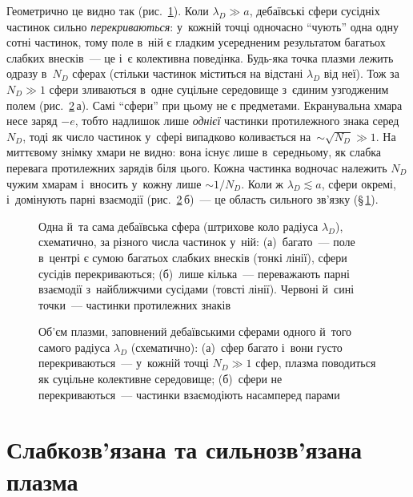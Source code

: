 Геометрично це видно так (рис.~\ref{fig:debye-overlap}). Коли $\lambda_D\gg a$, дебаївські сфери сусідніх
частинок сильно \emph{перекриваються}: у~кожній точці одночасно \enquote{чують} одна одну сотні
частинок, тому поле в~ній є гладким усередненим результатом багатьох слабких внесків~--- це і~є
колективна поведінка. Будь-яка точка плазми лежить
одразу в~$N_D$ сферах (стільки частинок міститься на відстані $\lambda_D$ від неї). Тож за
$N_D\gg1$ сфери зливаються в~одне суцільне середовище з~єдиним узгодженим полем
(рис.~\ref{fig:debye-volume}\,а). Самі \enquote{сфери} при цьому не є предметами. Екранувальна
хмара несе заряд $-e$, тобто надлишок лише \emph{однієї} частинки протилежного знака серед $N_D$,
тоді як число частинок у~сфері випадково коливається на~$\sim\sqrt{N_D}\gg1$. На миттєвому знімку
хмари не видно: вона існує лише в~середньому, як слабка перевага протилежних зарядів біля
цього. Кожна частинка водночас належить $N_D$ чужим хмарам і~вносить у~кожну лише $\sim1/N_D$. Коли ж $\lambda_D\lesssim a$, сфери окремі, і~домінують парні взаємодії (рис.~\ref{fig:debye-volume}\,б)~--- це область сильного зв'язку (§\,\ref{sec:coupling}).

\begin{figure}[!ht]\centering
	\caption{Одна й~та сама дебаївська сфера (штрихове коло радіуса $\lambda_D$), схематично, за різного числа
	частинок у~ній: (а)~багато~--- поле в~центрі є сумою багатьох слабких внесків (тонкі лінії), сфери сусідів
	перекриваються; (б)~лише кілька~--- переважають парні взаємодії з~найближчими сусідами (товсті лінії).
	Червоні й~сині точки~--- частинки протилежних знаків}
	\label{fig:debye-overlap}
\end{figure}

\begin{figure}[!ht]\centering
	\caption{Об'єм плазми, заповнений дебаївськими сферами одного й~того самого радіуса $\lambda_D$ (схематично):
	(а)~сфер багато і~вони густо перекриваються~--- у~кожній точці $N_D\gg1$ сфер, плазма поводиться як суцільне
	колективне середовище; (б)~сфери не перекриваються~--- частинки взаємодіють насамперед парами}
	\label{fig:debye-volume}
\end{figure}


\section{Слабкозв'язана та сильнозв'язана плазма}\label{sec:coupling}


